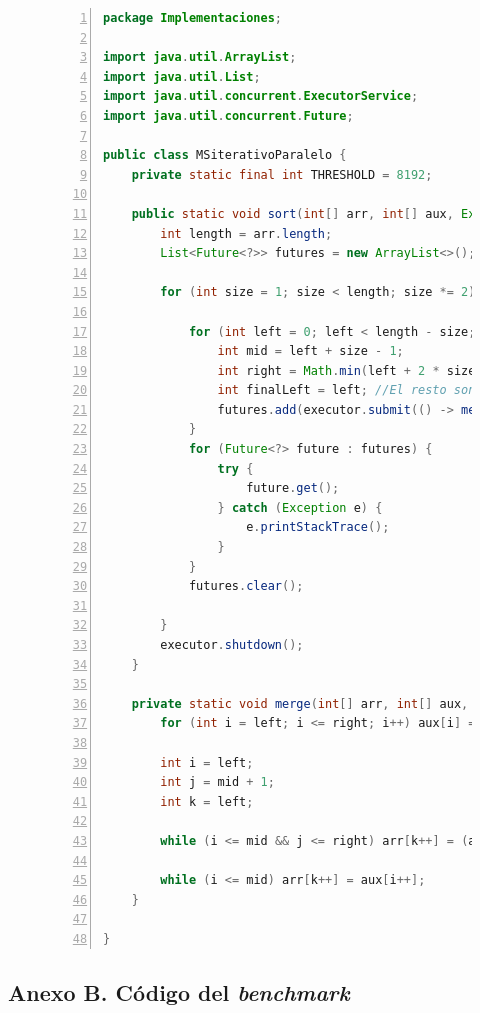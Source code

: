 \documentclass[titlepage]{article}
\begin{document}
\begin{figure}[h]
	\begin{lstlisting}[language=java, frame=single, numbers=left]
package Implementaciones;

import java.util.ArrayList;
import java.util.List;
import java.util.concurrent.ExecutorService;
import java.util.concurrent.Future;

public class MSiterativoParalelo {
	private static final int THRESHOLD = 8192;
	
	public static void sort(int[] arr, int[] aux, ExecutorService executor) {
		int length = arr.length;
		List<Future<?>> futures = new ArrayList<>();
		
		for (int size = 1; size < length; size *= 2) {
			
			for (int left = 0; left < length - size; left += 2 * size) {
				int mid = left + size - 1;
				int right = Math.min(left + 2 * size - 1, length - 1);
				int finalLeft = left; //El resto son efectivamente finales
				futures.add(executor.submit(() -> merge(arr, aux, finalLeft, mid, right)));
			}
			for (Future<?> future : futures) {
				try {
					future.get();
				} catch (Exception e) {
					e.printStackTrace();
				}
			}
			futures.clear();
			
		}
		executor.shutdown();
	}
	
	private static void merge(int[] arr, int[] aux, int left, int mid, int right) {
		for (int i = left; i <= right; i++) aux[i] = arr[i];
		
		int i = left;       
		int j = mid + 1;    
		int k = left;       
		
		while (i <= mid && j <= right) arr[k++] = (aux[i] <= aux[j])? aux[i++] : aux[j++];
		
		while (i <= mid) arr[k++] = aux[i++];
	}
	
}
	\end{lstlisting}
\end{figure}

\subsection{Anexo B. Código del \textit{benchmark}}
\end{document}

